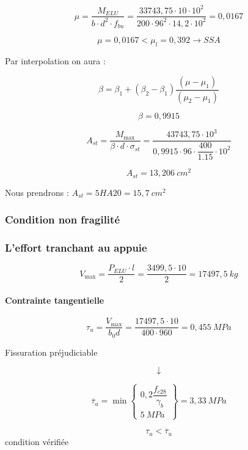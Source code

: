 \documentclass[12pt,a4paper]{article}
\begin{document}
	\[ \mu = \dfrac{M_{ELU}}{b \cdot d^{2} \cdot f_{bu}} = \dfrac{33743,75 \cdot 10 \cdot 10^{2}}{200 \cdot 96^{2} \cdot 14,2 \cdot 10^{2}} = 0,0167 \]
	
	\[ \mu = 0,0167 < \mu_{l} = 0,392 \rightarrow SSA \]
	
	{\centering Par interpolation on aura : \par}
	
	\[ \beta = \beta_{1} + (\beta_{2} - \beta_{1})\dfrac{(\mu - \mu_{1})}{(\mu_{2} - \mu_{1})} \]

	\[ \beta = 0,9915 \]
	
	\vspace{\baselineskip}
	
	\[ A_{st} = \dfrac{M_{\max}}{\beta \cdot d \cdot \sigma_{st}} = \dfrac{43743,75 \cdot 10^{3}}{0,9915 \cdot 96 \cdot \dfrac{400}{1.15} \cdot 10^{2}} \]
	
	\[ A_{st} = 13,206 ~\unit{cm^{2}} \]
	
	Nous prendrons : $A_{st} = 5HA20 = 15,7 ~\unit{cm^{2}}$
	
	
	\subsubsection{Condition non fragilité}
	
	\subsubsection{L'effort tranchant au appuie}
	
	\[ V_{\max} = \dfrac{P_{ELU} \cdot l}{2} = \dfrac{3499,5 \cdot 10}{2} = 17497,5 ~\unit{kg} \]
	
	
	\paragraph{Contrainte tangentielle}
	
	\[ \tau_{u} = \dfrac{V_{\max}}{b_{0}d} = \dfrac{17497,5 \cdot 10}{400 \cdot 960} = 0,455 ~\unit{MPa} \]
	
	{\centering Fissuration préjudiciable\par}
	\[ \downarrow \]
	
	\[ \overline{\tau}_{u} = \min\left.\begin{cases}
		0,2\dfrac{f_{c28}}{\gamma_{b}} \\
		5 ~\unit{MPa}
	\end{cases}\right\} = 3,33 ~\unit{MPa} \]
	
	\[ \tau_{u} < \overline{\tau}_{u} \]
	{\centering condition vérifiée}
	
\end{document}
